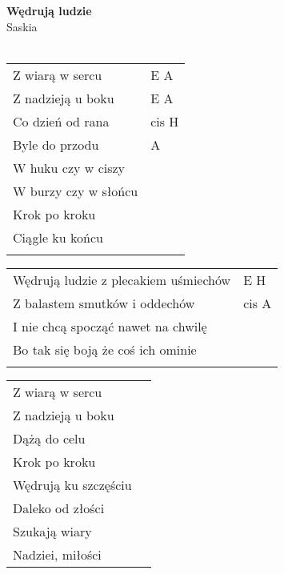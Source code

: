 \documentclass[a5paper]{article}
\begin{document}


\noindent
\fontsize{12pt}{15pt}\selectfont
\textbf{Wędrują ludzie} \\
\fontsize{8pt}{10pt}\selectfont
Saskia \\ \\
\fontsize{10pt}{12pt}\selectfont
{}
\begin{tabular}{@{}p{7.50cm}p{3cm}@{}}
\noindent
Z wiarą w sercu & E A \\
Z nadzieją u boku & E A \\
Co dzień od rana & cis H \\
Byle do przodu & A \\
W huku czy w ciszy \\
W burzy czy w słońcu \\
Krok po kroku \\
Ciągle ku końcu \\ \\
\end{tabular}

\noindent
\begin{tabular}{@{}p{6.50cm}p{3cm}@{}} 
Wędrują ludzie z plecakiem uśmiechów & E H \\
Z balastem smutków i oddechów & cis A \\
I nie chcą spocząć nawet na chwilę \\
Bo tak się boją że coś ich ominie \\ \\
\end{tabular}

\noindent
\begin{tabular}{@{}p{6.50cm}p{3cm}@{}} 
Z wiarą w sercu \\
Z nadzieją u boku \\
Dążą do celu \\
Krok po kroku \\
Wędrują ku szczęściu \\
Daleko od złości \\
Szukają wiary \\
Nadziei, miłości
\end{tabular}
\end{document}
